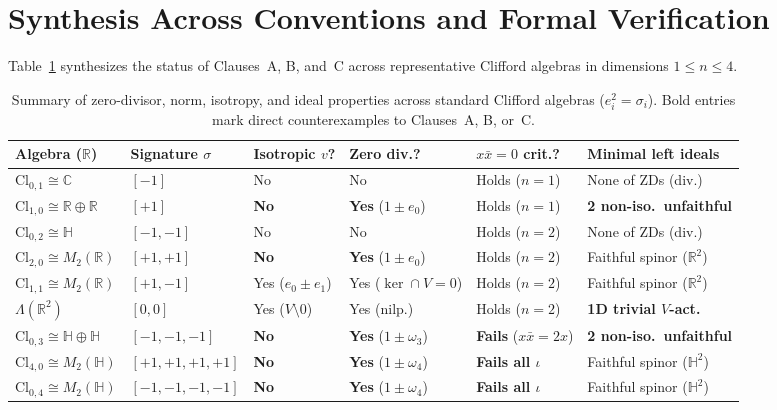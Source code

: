 \documentclass[11pt]{article}
\theoremstyle{definition}
\newcommand{\Cl}{\mathrm{Cl}}
\begin{document}
\section{Synthesis Across Conventions and Formal Verification}

Table~\ref{tab:summary} synthesizes the status of Clauses~A, B, and~C across
representative Clifford algebras in dimensions $1 \le n \le 4$.

\begin{table}[ht]
\centering
\footnotesize
\setlength{\tabcolsep}{4.2pt}
\renewcommand{\arraystretch}{1.22}
\begin{tabular}{@{}llllll@{}}
\toprule
Algebra ($\mathbb{R}$) & Signature $\sigma$ & Isotropic $v$? & Zero div.? & $x\bar{x}=0$ crit.? & Minimal left ideals \\
\midrule
$\Cl_{0,1} \cong \mathbb{C}$ & $[-1]$ & No & No & Holds ($n=1$) & None of ZDs (div.) \\
$\Cl_{1,0} \cong \mathbb{R}\oplus\mathbb{R}$ & $[+1]$ & \textbf{No} & \textbf{Yes} ($1\pm e_0$) & Holds ($n=1$) & \textbf{2 non-iso.\ unfaithful} \\
$\Cl_{0,2} \cong \mathbb{H}$ & $[-1,-1]$ & No & No & Holds ($n=2$) & None of ZDs (div.) \\
$\Cl_{2,0} \cong M_2(\mathbb{R})$ & $[+1,+1]$ & \textbf{No} & \textbf{Yes} ($1\pm e_0$) & Holds ($n=2$) & Faithful spinor ($\mathbb{R}^2$) \\
$\Cl_{1,1} \cong M_2(\mathbb{R})$ & $[+1,-1]$ & Yes ($e_0\pm e_1$) & Yes ($\ker\cap V=0$) & Holds ($n=2$) & Faithful spinor ($\mathbb{R}^2$) \\
$\Lambda(\mathbb{R}^2)$ & $[0,0]$ & Yes ($V\setminus 0$) & Yes (nilp.) & Holds ($n=2$) & \textbf{1D trivial $V$-act.} \\
$\Cl_{0,3} \cong \mathbb{H}\oplus\mathbb{H}$ & $[-1,-1,-1]$ & \textbf{No} & \textbf{Yes} ($1\pm\omega_3$) & \textbf{Fails} ($x\bar{x}=2x$) & \textbf{2 non-iso.\ unfaithful} \\
$\Cl_{4,0} \cong M_2(\mathbb{H})$ & $[+1,+1,+1,+1]$ & \textbf{No} & \textbf{Yes} ($1\pm\omega_4$) & \textbf{Fails all $\iota$} & Faithful spinor ($\mathbb{H}^2$) \\
$\Cl_{0,4} \cong M_2(\mathbb{H})$ & $[-1,-1,-1,-1]$ & \textbf{No} & \textbf{Yes} ($1\pm\omega_4$) & \textbf{Fails all $\iota$} & Faithful spinor ($\mathbb{H}^2$) \\
\bottomrule
\end{tabular}
\caption{Summary of zero-divisor, norm, isotropy, and ideal properties across
standard Clifford algebras ($e_i^2 = \sigma_i$). Bold entries mark direct
counterexamples to Clauses~A, B, or~C.}
\label{tab:summary}
\end{table}
\end{document}
